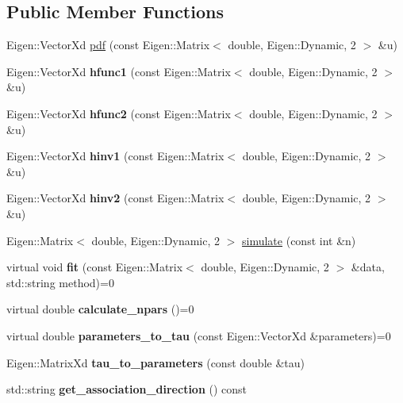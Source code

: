\subsection*{Public Member Functions}
\begin{DoxyCompactItemize}
\item 
Eigen\+::\+Vector\+Xd \hyperlink{classvinecopulib_1_1_bicop_a83dc7214e4bb1bfe59285ca05407d646}{pdf} (const Eigen\+::\+Matrix$<$ double, Eigen\+::\+Dynamic, 2 $>$ \&u)
\item 
Eigen\+::\+Vector\+Xd {\bfseries hfunc1} (const Eigen\+::\+Matrix$<$ double, Eigen\+::\+Dynamic, 2 $>$ \&u)
\item 
Eigen\+::\+Vector\+Xd {\bfseries hfunc2} (const Eigen\+::\+Matrix$<$ double, Eigen\+::\+Dynamic, 2 $>$ \&u)
\item 
Eigen\+::\+Vector\+Xd {\bfseries hinv1} (const Eigen\+::\+Matrix$<$ double, Eigen\+::\+Dynamic, 2 $>$ \&u)
\item 
Eigen\+::\+Vector\+Xd {\bfseries hinv2} (const Eigen\+::\+Matrix$<$ double, Eigen\+::\+Dynamic, 2 $>$ \&u)
\item 
Eigen\+::\+Matrix$<$ double, Eigen\+::\+Dynamic, 2 $>$ \hyperlink{classvinecopulib_1_1_bicop_aeb87bea4283dacfa5e609356c020f85d}{simulate} (const int \&n)
\item 
virtual void {\bfseries fit} (const Eigen\+::\+Matrix$<$ double, Eigen\+::\+Dynamic, 2 $>$ \&data, std\+::string method)=0\hypertarget{classvinecopulib_1_1_bicop_a4f0bf601256a692fde44f2f5a841cb43}{}\label{classvinecopulib_1_1_bicop_a4f0bf601256a692fde44f2f5a841cb43}

\item 
virtual double {\bfseries calculate\+\_\+npars} ()=0\hypertarget{classvinecopulib_1_1_bicop_ad183131404bde979da0969f82317a288}{}\label{classvinecopulib_1_1_bicop_ad183131404bde979da0969f82317a288}

\item 
virtual double {\bfseries parameters\+\_\+to\+\_\+tau} (const Eigen\+::\+Vector\+Xd \&parameters)=0\hypertarget{classvinecopulib_1_1_bicop_a70854b18c889b6ff23519c745b139905}{}\label{classvinecopulib_1_1_bicop_a70854b18c889b6ff23519c745b139905}

\item 
Eigen\+::\+Matrix\+Xd {\bfseries tau\+\_\+to\+\_\+parameters} (const double \&tau)\hypertarget{classvinecopulib_1_1_bicop_a5809ddc9884f6fb66fe53289be348913}{}\label{classvinecopulib_1_1_bicop_a5809ddc9884f6fb66fe53289be348913}

\item 
std\+::string {\bfseries get\+\_\+association\+\_\+direction} () const \hypertarget{classvinecopulib_1_1_bicop_abfef8396fef667444fa83f6fed1c038d}{}\label{classvinecopulib_1_1_bicop_abfef8396fef667444fa83f6fed1c038d}


\end{DoxyCompactItemize}
